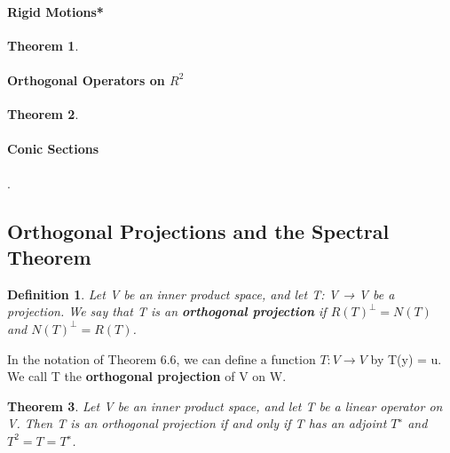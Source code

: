 \documentclass{article}
\newcommand{\bd}[1]{\textbf{#1}}
\theoremstyle{plain}
\newtheorem{theorem}{Theorem}[section]
\newtheorem*{definition1}{Definition}
\theoremstyle{plain} %
\begin{document}
\paragraph{Rigid Motions*}

\begin{theorem}
  
\end{theorem}


\paragraph{Orthogonal Operators on $R^2$}

\begin{theorem}
  
\end{theorem}

\paragraph{Conic Sections}

.

\subsection{Orthogonal Projections and the Spectral Theorem}

\begin{definition1}
  Let V be an inner product space, and let T: V → V be a projection. We say that T is an \bd{orthogonal projection} if $R(T)^\perp = N(T)$ and $N(T)^\perp = R(T)$.
\end{definition1}

In the notation of Theorem 6.6, we can define a function $T: V \to V$ by T(y) = u. We call T the \bd{orthogonal projection} of V on W.

\begin{theorem}
  Let V be an inner product space, and let T be a linear operator on V. Then T is an orthogonal projection if and only if T has an adjoint $T^∗$ and $T^2 = T = T^∗$.
\end{theorem}
\end{document}
